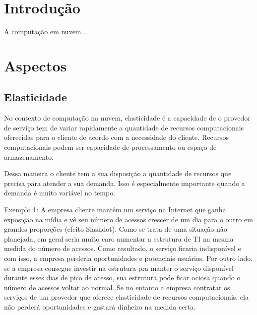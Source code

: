 
\section{Introdução}
A computação em nuvem... \cite{acm:s3,wired:end,akita}

\section{Aspectos}

\subsection{Elasticidade}



No contexto de computação na nuvem, elasticidade é a capacidade de o provedor de serviço tem de variar rapidamente a quantidade de recursos computacionais oferecidas para o cliente de acordo com a necessidade do cliente. Recursos computacionais podem ser capacidade de processamento ou espaço de armazenamento.


Dessa maneira o cliente tem a sua disposição a quantidade de recursos que precisa para atender a sua demanda. Isso é especialmente importante quando a demanda é muito variável no tempo.

Exemplo 1: A empresa cliente mantém um serviço na Internet que ganha exposição na mídia e vê seu número de acessos crescer de um dia para o outro em grandes proporções (efeito Slashdot). Como se trata de uma situação não planejada, em geral seria muito caro aumentar a estrutura de TI na mesma medida do número de acessos. Como resultado, o serviço ficaria indisponível e com isso, a empresa perderia oportunidades e potenciais usuários. Por outro lado, se a empresa consegue investir na estrutura pra manter o serviço disponível durante esses dias de pico de acesso, sua estrutura pode ficar ociosa quando o número de acessos voltar ao normal. Se no entanto a empresa contratar os serviços de um provedor que oferece elasticidade de recursos computacionais, ela não perderá oportunidades e gastará dinheiro na medida certa.

